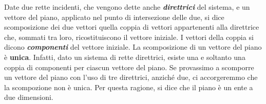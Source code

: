 Date due rette incidenti, che vengono dette anche {\bfseries \slshape {direttrici}} del sistema, e un vettore del piano, applicato nel punto di intersezione delle due, si dice scomposizione dei due vettori quella coppia di vettori appartenenti alla direttrice che, sommati tra loro, ricostituiscono il vettore iniziale. I vettori della coppia si dicono {\bfseries \slshape{componenti}} del vettore iniziale.\newline
La scomposizione di un vettore del piano è {\bfseries unica}. Infatti, dato un sistema di rette direttrici, esiste una e soltanto una coppia di componenti per ciascun vettore del piano. Se provassimo a scomporre un vettore del piano con l'uso di tre direttrici, anziché due, ci accorgeremmo che la scompozione non è unica. Per questa ragione, si dice che il piano è un ente a due dimensioni.

